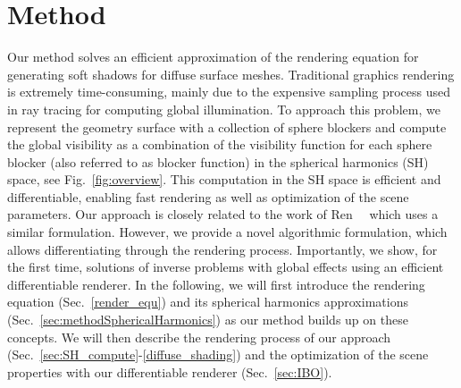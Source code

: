 %
%
\section{Method}
%
\label{sec:method}
%
Our method solves an efficient approximation of the rendering equation for generating soft shadows for diffuse surface meshes.
%
Traditional graphics rendering is extremely time-consuming, mainly due to the expensive sampling process used in ray tracing for computing global illumination. 
%
To approach this problem, we represent the geometry surface with a collection of sphere blockers and compute the global visibility as a combination of the visibility function for each sphere blocker (also referred to as blocker function) in the spherical harmonics (SH) space, see Fig.~\ref{fig:overview}. 
%
This computation in the SH space is efficient and differentiable, enabling fast rendering as well as optimization of the scene parameters. 
%
Our approach is closely related to the work of Ren~\etal~\cite{ren2006real} which uses a similar formulation. 
%
However, we provide a novel algorithmic formulation, which allows differentiating through the rendering process.
%
Importantly, we show, for the first time, solutions of inverse problems with global effects using an efficient differentiable renderer. 
%
In the following, we will first introduce the rendering equation (Sec.~\ref{render_equ}) and its spherical harmonics approximations (Sec.~\ref{sec:methodSphericalHarmonics}) as our method builds up on these concepts.
%
We will then describe the rendering process of our approach (Sec.~\ref{sec:SH_compute}-\ref{diffuse_shading}) and the optimization of the scene properties with our differentiable renderer (Sec.~\ref{sec:IBO}). 
%
%
